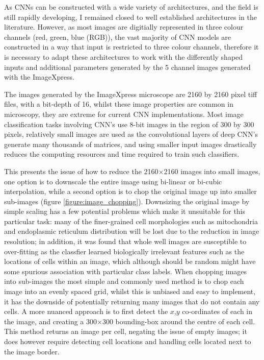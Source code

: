 \documentclass[a4paper,11pt,twoside,openright]{scrbook}
\begin{document}

As CNNs can be constructed with a wide variety of architectures, and the field is still rapidly developing, I remained closed to well established architectures in the literature.
However, as most images are digitially represented in three colour channels (red, green, blue (RGB)), the vast majority of CNN models are constructed in a way that input is restricted to three colour channels, therefore it is necessary to adapt these architectures to work with the differently shaped inputs and additional parameters generated by the 5 channel images generated with the ImageXpress.



The images generated by the ImageXpress microscope are 2160 by 2160 pixel tiff files, with a bit-depth of 16, whilst these image properties are common in microscopy, they are extreme for current CNN implementations.
Most image classification tasks involving CNN's use 8-bit images in the region of 300 by 300 pixels, relatively small images are used as the convolutional layers of deep CNN's generate many thousands of matrices, and using smaller input images drastically reduces the computing resources and time required to train such classifiers.

This presents the issue of how to reduce the 2160$\times$2160 images into small images, one option is to downscale the entire image using bi-linear or bi-cubic interpolation, while a second option is to chop the original image up into smaller sub-images (figure \ref{figure:image_chopping}).
Downsizing the original image by simple scaling has a few potential problems which make it unsuitable for this particular task:
    many of the finer-grained cell morphologies such as mitochondria and endoplasmic reticulum distribution will be lost due to the reduction in image resolution;
    in addition, it was found that whole well images are susceptible to over-fitting as the classfier learned biologically irrelevant features such as the locations of cells within an image, which although should be random might have some spurious association with particular class labels.
When chopping images into sub-images the most simple and commonly used method is to chop each image into an evenly spaced grid, whilst this is unbiased and easy to implement, it has the downside of potentially returning many images that do not contain any cells.
A more nuanced approach is to first detect the $x$,$y$ co-ordinates of each  in the image, and creating a 300$\times$300 bounding-box around the centre of each cell.
This method returns an image per cell, negating the issue of empty images; it does however require detecting cell locations and handling cells located next to the image border.
\end{document}
